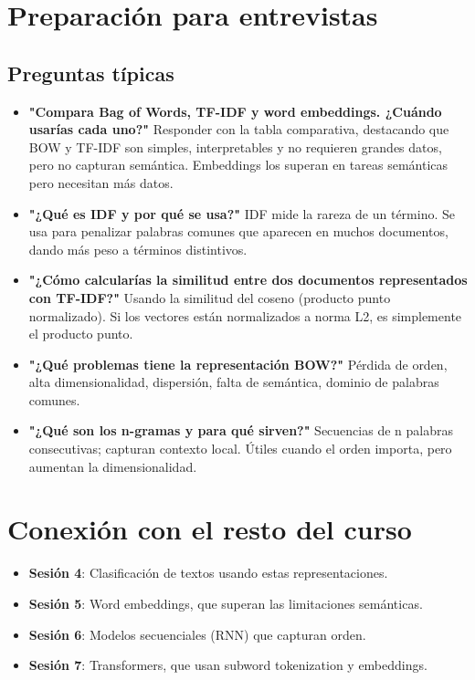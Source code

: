 \documentclass[12pt,a4paper,openany,oneside]{book}
\begin{document}
\section{Preparación para entrevistas}

\subsection{Preguntas típicas}
\begin{itemize}
    \item \textbf{"Compara Bag of Words, TF-IDF y word embeddings. ¿Cuándo usarías cada uno?"}
    Responder con la tabla comparativa, destacando que BOW y TF-IDF son simples, interpretables y no requieren grandes datos, pero no capturan semántica. Embeddings los superan en tareas semánticas pero necesitan más datos.
    \item \textbf{"¿Qué es IDF y por qué se usa?"}
    IDF mide la rareza de un término. Se usa para penalizar palabras comunes que aparecen en muchos documentos, dando más peso a términos distintivos.
    \item \textbf{"¿Cómo calcularías la similitud entre dos documentos representados con TF-IDF?"}
    Usando la similitud del coseno (producto punto normalizado). Si los vectores están normalizados a norma L2, es simplemente el producto punto.
    \item \textbf{"¿Qué problemas tiene la representación BOW?"}
    Pérdida de orden, alta dimensionalidad, dispersión, falta de semántica, dominio de palabras comunes.
    \item \textbf{"¿Qué son los n-gramas y para qué sirven?"}
    Secuencias de n palabras consecutivas; capturan contexto local. Útiles cuando el orden importa, pero aumentan la dimensionalidad.
\end{itemize}

\section{Conexión con el resto del curso}
\begin{itemize}
    \item \textbf{Sesión 4}: Clasificación de textos usando estas representaciones.
    \item \textbf{Sesión 5}: Word embeddings, que superan las limitaciones semánticas.
    \item \textbf{Sesión 6}: Modelos secuenciales (RNN) que capturan orden.
    \item \textbf{Sesión 7}: Transformers, que usan subword tokenization y embeddings.
\end{itemize}
\end{document}
